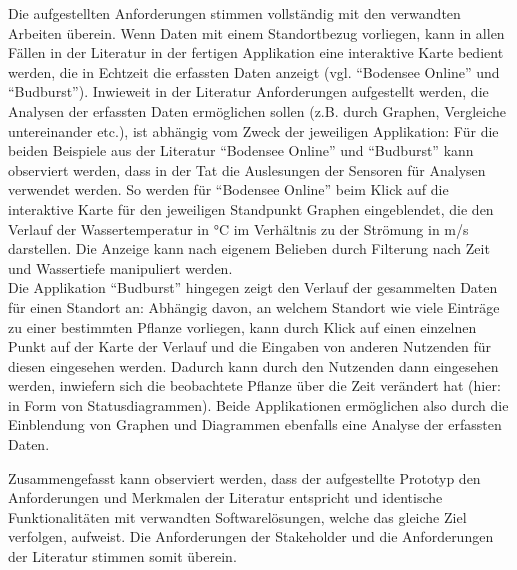 Die aufgestellten Anforderungen stimmen vollständig mit den verwandten Arbeiten überein. Wenn Daten mit einem Standortbezug vorliegen, kann in allen Fällen in der Literatur in der fertigen Applikation eine interaktive Karte bedient werden, die in Echtzeit die erfassten Daten anzeigt (vgl. \enquote{Bodensee Online} und \enquote{Budburst}). Inwieweit in der Literatur Anforderungen aufgestellt werden, die Analysen der erfassten Daten ermöglichen sollen (z.B. durch Graphen, Vergleiche untereinander etc.), ist abhängig vom Zweck der jeweiligen Applikation: Für die beiden Beispiele aus der Literatur \enquote{Bodensee Online} und \enquote{Budburst} kann observiert werden, dass in der Tat die Auslesungen der Sensoren für Analysen verwendet werden. So werden für \enquote{Bodensee Online} beim Klick auf die interaktive Karte für den jeweiligen Standpunkt Graphen eingeblendet, die den Verlauf der Wassertemperatur in °C im Verhältnis zu der Strömung in m/s darstellen. Die Anzeige kann nach eigenem Belieben durch Filterung nach Zeit und Wassertiefe manipuliert werden. \\ Die Applikation \enquote{Budburst} hingegen zeigt den Verlauf der gesammelten Daten für einen Standort an: Abhängig davon, an welchem Standort wie viele Einträge zu einer bestimmten Pflanze vorliegen, kann durch Klick auf einen einzelnen Punkt auf der Karte der Verlauf und die Eingaben von anderen Nutzenden für diesen eingesehen werden. Dadurch kann durch den Nutzenden dann eingesehen werden, inwiefern sich die beobachtete Pflanze über die Zeit verändert hat (hier: in Form von Statusdiagrammen). Beide Applikationen ermöglichen also durch die Einblendung von Graphen und Diagrammen ebenfalls eine Analyse der erfassten Daten. 

Zusammengefasst kann observiert werden, dass der aufgestellte Prototyp den Anforderungen und Merkmalen der Literatur entspricht und identische Funktionalitäten mit verwandten Softwarelösungen, welche das gleiche Ziel verfolgen, aufweist. Die Anforderungen der Stakeholder und die Anforderungen der Literatur stimmen somit überein.

